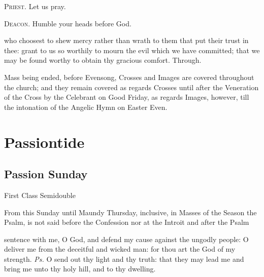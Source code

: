 \textsc{Priest.} Let us pray.\par
\textsc{Deacon.} Humble your heads before God.\par
{} who choosest to shew mercy rather than wrath to them that put their trust in thee: grant to us so worthily to mourn the evil which we have committed; that we may be found worthy to obtain thy gracious comfort. Through.

\begin{rubric}
	Mass being ended, before Evensong, Crosses and Images are covered throughout the church; and they remain covered as regards Crosses until after the Veneration of the Cross by the Celebrant on Good Friday, as regards Images, however, till the intonation of the Angelic Hymn on Easter Even.
\end{rubric}


\clearpage

\section{Passiontide}

\subsection{Passion Sunday}\label{PassionSunday}
\begin{inhead}
{First Class Semidouble}
\end{inhead}

\begin{rubric}
    From this Sunday until Maundy Thursday, inclusive, in Masses of the Season the Psalm,  is not said before the Confession nor  at the Introit and after the Psalm 
\end{rubric}

\vspace{-0.55\baselineskip}

\introit

\vspace{-0.2\baselineskip}

 sentence with me, O God, and defend my cause against the ungodly people: O deliver me from the deceitful and wicked man: for thou art the God of my strength. \textit{Ps.} O send out thy light and thy truth: that they may lead me and bring me unto thy holy hill, and to thy dwelling.

